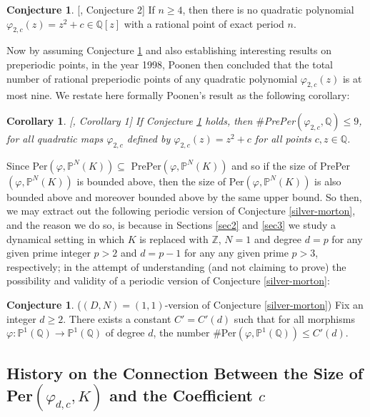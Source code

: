 \documentclass{article}
\theoremstyle{plain}
\newtheorem{cor}[thm]{Corollary}
\theoremstyle{definition}
\newtheorem{conj}[thm]{Conjecture}
\begin{document}
\begin{conj} \label{conj:2.4.1}[\cite{Flynn}, Conjecture 2]
If $n \geq 4$, then there is no quadratic polynomial $\varphi_{2,c }(z) = z^2 + c\in \mathbb{Q}[z]$ with a rational point of exact period $n$.
\end{conj}
Now by assuming Conjecture \ref{conj:2.4.1} and also establishing interesting results on preperiodic points, in the year 1998, Poonen \cite{Poonen} then concluded that the total number of rational preperiodic points of any quadratic polynomial $\varphi_{2, c}(z)$ is at most nine. We restate here formally Poonen's result as the following corollary:
\begin{cor}\label{cor2}[\cite{Poonen}, Corollary 1]
If Conjecture \ref{conj:2.4.1} holds, then $\#$PrePer$(\varphi_{2,c}, \mathbb{Q}) \leq 9$,  for all quadratic maps $\varphi_{2, c}$ defined by $\varphi_{2, c}(z) = z^2 + c$ for all points $c, z\in\mathbb{Q}$.
\end{cor}

Since Per$(\varphi, {\mathbb{P}^N(K)}) \subseteq$ PrePer$(\varphi, {\mathbb{P}^N(K)})$ and so if the size of PrePer$(\varphi, \mathbb{P}^N(K))$ is bounded above, then the size of Per$(\varphi, \mathbb{P}^N(K))$ is also bounded above and moreover bounded above by the same upper bound. So then, we may extract out the following periodic version of Conjecture \ref{silver-morton}, and the reason we do so, is because in Sections \ref{sec2} and \ref{sec3} we study a dynamical setting in which $K$ is replaced with $\mathbb{Z}$, $N=1$ and degree $d=p$ for any given prime integer $p> 2$ and $d = p-1$ for any any given prime $p>3$, respectively; in the attempt of understanding (and not claiming to prove) the possibility and validity of a periodic version of Conjecture \ref{silver-morton}:

\begin{conj} \label{silver-morton 1}($(D, N) = (1,1)$-version of Conjecture \ref{silver-morton})\label{per}
Fix an integer $d \geq 2$. There exists a constant $C'= C'(d)$ such that for all morphisms $\varphi: {\mathbb{P}}^{1}(\mathbb{Q}) \rightarrow {\mathbb{P}}^{1}(\mathbb{Q})$ of degree $d$, the number $\#$Per$(\varphi, {\mathbb{P}}^{1}(\mathbb{Q})) \leq C'(d)$.
\end{conj}

\subsection*{History on the Connection Between the Size of Per$(\varphi_{d, c}, K)$ and the Coefficient $c$}
\end{document}
